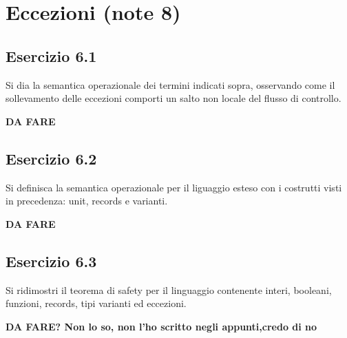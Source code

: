 \section{Eccezioni (note 8)}
\subsection*{Esercizio 6.1}
Si dia la semantica operazionale dei termini indicati sopra, osservando come il sollevamento delle eccezioni comporti un salto non locale del flusso di controllo.

\textbf{{\color{red} DA FARE}}


\subsection*{Esercizio 6.2}
Si definisca la semantica operazionale per il liguaggio esteso con i costrutti visti in precedenza: unit, records e varianti.


\textbf{{\color{red} DA FARE}}


\subsection*{Esercizio 6.3}
Si ridimostri il teorema di safety per il linguaggio contenente interi, booleani, funzioni, records, tipi varianti ed eccezioni.

\textbf{{\color{red} DA FARE? Non lo so, non l'ho scritto negli appunti,credo di no}}
